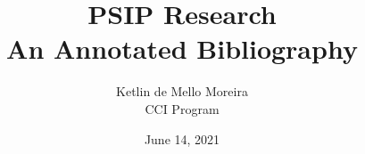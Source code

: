 \documentclass [11pt]{article}
\title{PSIP Research\\\medskip An Annotated Bibliography}
\author{Ketlin de Mello Moreira\\CCI Program}
\date{June 14, 2021}
\begin{document}
\maketitle
\nocite{*}


\end{document}
